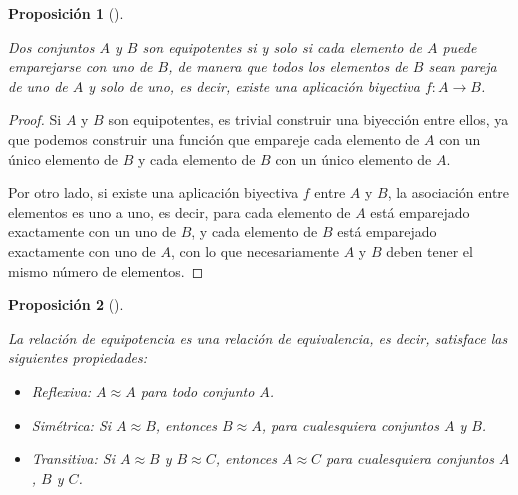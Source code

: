 \documentclass[
  a4paper,
]{scrreport}
\providecommand{\tightlist}{%
  \setlength{\itemsep}{0pt}\setlength{\parskip}{0pt}}\usepackage{longtable,booktabs,array}
\theoremstyle{definition}
\theoremstyle{plain}
\theoremstyle{plain}
\theoremstyle{definition}
\theoremstyle{plain}
\newtheorem{proposition}{Proposición}[chapter]
\theoremstyle{remark}
\begin{document}
\begin{proposition}[]\protect\hypertarget{prp-biyeccion-conjuntos-equipotentes}{}\label{prp-biyeccion-conjuntos-equipotentes}

Dos conjuntos \(A\) y \(B\) son equipotentes si y solo si cada elemento
de \(A\) puede emparejarse con uno de \(B\), de manera que todos los
elementos de \(B\) sean pareja de uno de \(A\) y solo de uno, es decir,
existe una aplicación biyectiva \(f:A\rightarrow B\).

\end{proposition}

\begin{tcolorbox}[enhanced jigsaw, toptitle=1mm, rightrule=.15mm, colbacktitle=quarto-callout-note-color!10!white, bottomtitle=1mm, breakable, leftrule=.75mm, titlerule=0mm, coltitle=black, opacityback=0, colback=white, toprule=.15mm, title=\textcolor{quarto-callout-note-color}{\faInfo}\hspace{0.5em}{Demostración}, arc=.35mm, bottomrule=.15mm, colframe=quarto-callout-note-color-frame, left=2mm, opacitybacktitle=0.6]

\begin{proof}

Si \(A\) y \(B\) son equipotentes, es trivial construir una biyección
entre ellos, ya que podemos construir una función que empareje cada
elemento de \(A\) con un único elemento de \(B\) y cada elemento de
\(B\) con un único elemento de \(A\).

Por otro lado, si existe una aplicación biyectiva \(f\) entre \(A\) y
\(B\), la asociación entre elementos es uno a uno, es decir, para cada
elemento de \(A\) está emparejado exactamente con un uno de \(B\), y
cada elemento de \(B\) está emparejado exactamente con uno de \(A\), con
lo que necesariamente \(A\) y \(B\) deben tener el mismo número de
elementos.

\end{proof}

\end{tcolorbox}

\begin{proposition}[]\protect\hypertarget{prp-equipotencia-relacion-equivalencia}{}\label{prp-equipotencia-relacion-equivalencia}

La relación de equipotencia es una relación de equivalencia, es decir,
satisface las siguientes propiedades:

\begin{itemize}
\tightlist
\item
  \emph{Reflexiva:} \(A\approx A\) para todo conjunto \(A\).
\item
  \emph{Simétrica:} Si \(A\approx B\), entonces \(B\approx A\), para
  cualesquiera conjuntos \(A\) y \(B\).
\item
  \emph{Transitiva:} Si \(A\approx B\) y \(B\approx C\), entonces
  \(A\approx C\) para cualesquiera conjuntos \(A\), \(B\) y \(C\).
\end{itemize}

\end{proposition}
\end{document}
